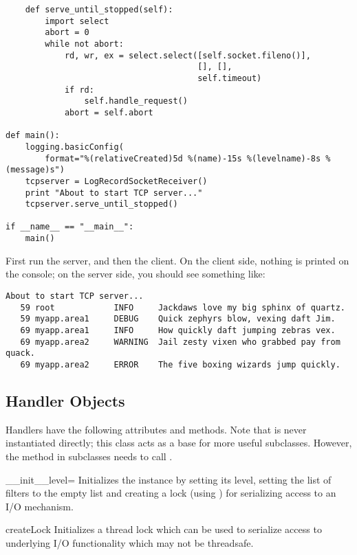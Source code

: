 \begin{verbatim}
    def serve_until_stopped(self):
        import select
        abort = 0
        while not abort:
            rd, wr, ex = select.select([self.socket.fileno()],
                                       [], [],
                                       self.timeout)
            if rd:
                self.handle_request()
            abort = self.abort

def main():
    logging.basicConfig(
        format="%(relativeCreated)5d %(name)-15s %(levelname)-8s %(message)s")
    tcpserver = LogRecordSocketReceiver()
    print "About to start TCP server..."
    tcpserver.serve_until_stopped()

if __name__ == "__main__":
    main()
\end{verbatim}

First run the server, and then the client. On the client side, nothing is
printed on the console; on the server side, you should see something like:

\begin{verbatim}
About to start TCP server...
   59 root            INFO     Jackdaws love my big sphinx of quartz.
   59 myapp.area1     DEBUG    Quick zephyrs blow, vexing daft Jim.
   69 myapp.area1     INFO     How quickly daft jumping zebras vex.
   69 myapp.area2     WARNING  Jail zesty vixen who grabbed pay from quack.
   69 myapp.area2     ERROR    The five boxing wizards jump quickly.
\end{verbatim}

\subsection{Handler Objects}

Handlers have the following attributes and methods. Note that
 is never instantiated directly; this class acts as a
base for more useful subclasses. However, the 
method in subclasses needs to call .

\begin{methoddesc}{__init__}{level=}
Initializes the  instance by setting its level, setting
the list of filters to the empty list and creating a lock (using
) for serializing access to an I/O mechanism.
\end{methoddesc}

\begin{methoddesc}{createLock}{}
Initializes a thread lock which can be used to serialize access to
underlying I/O functionality which may not be threadsafe.
\end{methoddesc}

